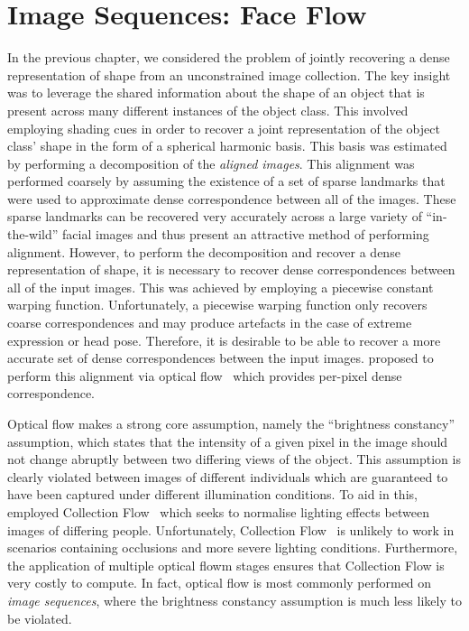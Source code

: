 \chapter{Image Sequences: Face Flow}\label{ch:face_flow}
\minitoc{}
In the previous chapter, we considered the problem of jointly recovering a
dense representation of shape from an unconstrained image collection. The key
insight was to leverage the shared information about the shape of an object
that is present across many different instances of the object class. This
involved employing shading cues in order to recover a joint representation
of the object class' shape in the form of a spherical harmonic basis. This
basis was estimated by performing a decomposition of the
\textit{aligned images}. This alignment was performed coarsely by assuming the
existence of a set of sparse landmarks that were used to approximate
dense correspondence between all of the images. These sparse landmarks can
be recovered very accurately across a large variety of ``in-the-wild'' facial
images and thus present an attractive method of performing alignment. However,
to perform the decomposition and recover a dense representation of shape, it
is necessary to recover dense correspondences between all of the input images. 
This was achieved by employing a piecewise constant warping function. Unfortunately, a
piecewise warping function only recovers coarse correspondences and may produce
artefacts in the case of extreme expression or head pose. Therefore, it is
desirable to be able to recover a more accurate set of dense correspondences 
between the input images. \citet{KemelmacherShlizerman:2013iv} proposed to
perform this alignment via optical flow~\cite{liu2009beyond} which provides
per-pixel dense correspondence. 

Optical flow makes a
strong core assumption, namely the ``brightness constancy'' assumption, which states
that the intensity of a given pixel in the image should not change abruptly
between two differing views of the object. This assumption is clearly
violated between images of different individuals which are guaranteed to
have been captured under different illumination conditions. To aid in this,
\citet{KemelmacherShlizerman:2013iv} employed
Collection Flow~\cite{kemelmacher2012collection} which seeks to normalise
lighting effects between images of differing people. Unfortunately, 
Collection Flow~\cite{kemelmacher2012collection} is unlikely to work in
scenarios containing occlusions and more severe lighting conditions.
Furthermore, the application of multiple optical flowm stages ensures that Collection
Flow is very costly to compute. In fact, optical flow is most commonly performed
on \textit{image sequences}, where the brightness constancy assumption is
much less likely to be violated. 

